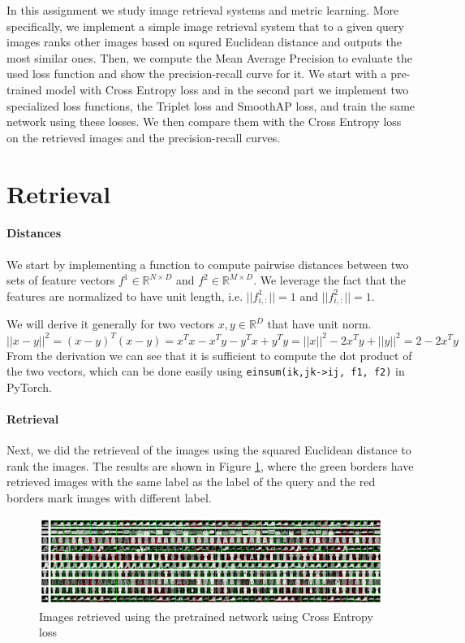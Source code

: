 \documentclass[a4paper,11pt]{article}
\begin{document}
In this assignment we study image retrieval systems and metric learning.
More specifically, we implement a simple image retrieval system that to a given query images ranks other images based on squred Euclidean distance and outputs the most similar ones.
Then, we compute the Mean Average Precision to evaluate the used loss function and show the precision-recall curve for it.
We start with a pre-trained model with Cross Entropy loss and in the second part we implement two specialized loss functions, the Triplet loss and SmoothAP loss, and train the same network using these losses.
We then compare them with the Cross Entropy loss on the retrieved images and the precision-recall curves.

\section{Retrieval}

\paragraph{Distances} We start by implementing a function to compute pairwise distances between two sets of feature vectors $f^1 \in \mathbb{R}^{N \times D}$ and $f^2 \in \mathbb{R}^{M \times D}$.
We leverage the fact that the features are normalized to have unit length, i.e. $||f^1_{i,:}|| = 1$ and $||f^2_{i,:}|| = 1$.

We will derive it generally for two vectors $x, y \in \mathbb{R}^D$ that have unit norm.
$$
    ||x - y||^2 = (x - y)^T(x - y) = x^Tx - x^Ty - y^Tx + y^Ty = ||x||^2 - 2x^Ty + ||y||^2 = 2 - 2x^Ty
$$
From the derivation we can see that it is sufficient to compute the dot product of the two vectors, which can be done easily using \texttt{einsum(ik,jk->ij, f1, f2)} in PyTorch.

\paragraph{Retrieval} Next, we did the retrieveal of the images using the squared Euclidean distance to rank the images.
The results are shown in Figure \ref{fig:retrieval_ce}, where the green borders have retrieved images with the same label as the label of the query and the red borders mark images with different label.
\begin{figure}[ht]
    \centering
    \includegraphics[width=\textwidth]{../outputs/ce_retrieval.png}
    \caption{Images retrieved using the pretrained network using Cross Entropy loss}
    \label{fig:retrieval_ce}
\end{figure}
\end{document}
